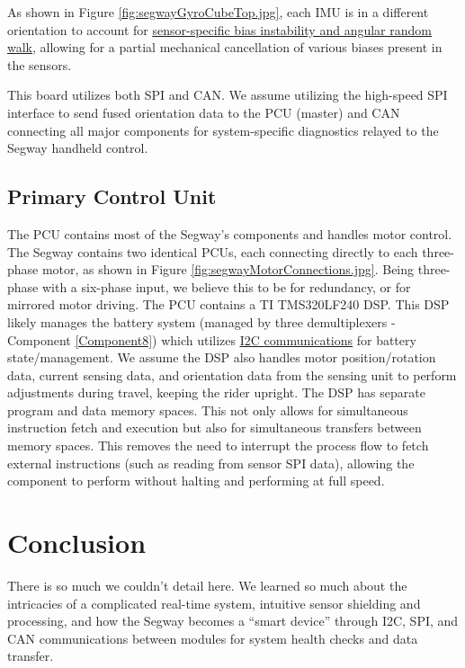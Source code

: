 \documentclass[]{formalLabReport}
\begin{document}
As shown in Figure \underline{\ref{fig:segwayGyroCubeTop.jpg}}, each IMU is in a different orientation to account for \href{https://base.xsens.com/hc/en-us/articles/209611089-Understanding-Sensor-Bias-offset-}{\underline{sensor-specific} \underline{bias instability and angular random walk}}, allowing for a partial mechanical cancellation of various biases present in the sensors. 

This board utilizes both SPI and CAN. We assume utilizing the high-speed SPI interface to send fused orientation data to the PCU (master) and CAN connecting all major components for system-specific diagnostics relayed to the Segway handheld control.

\subsection{Primary Control Unit}
The PCU contains most of the Segway’s components and handles motor control. The Segway contains two identical PCUs, each connecting directly to each three-phase motor, as shown in Figure \underline{\ref{fig:segwayMotorConnections.jpg}}. Being three-phase with a six-phase input, we believe this to be for redundancy, or for mirrored motor driving. The PCU contains a TI TMS320LF240 DSP. This DSP likely manages the battery system (managed by three demultiplexers - Component \underline{\ref{Component8}}) which utilizes \href{https://github.com/martinbogo/pt-battery-diagnostics}{\underline{I2C} \underline{communications}} for battery state/management. We assume the DSP also handles motor position/rotation data, current sensing data, and orientation data from the sensing unit to perform adjustments during travel, keeping the rider upright. The DSP has separate program and data memory spaces. This not only allows for simultaneous instruction fetch and execution but also for simultaneous transfers between memory spaces. This removes the need to interrupt the process flow to fetch external instructions (such as reading from sensor SPI data), allowing the component to perform without halting and performing at full speed.

\section{Conclusion}
There is so much we couldn’t detail here. We learned so much about the intricacies of a complicated real-time system, intuitive sensor shielding and processing, and how the Segway becomes a “smart device” through I2C, SPI, and CAN communications between modules for system health checks and data transfer.
\end{document}

